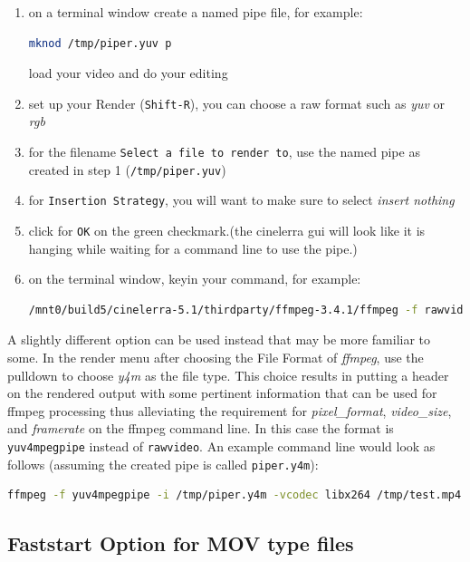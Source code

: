 \begin{enumerate}
    \item on a terminal window create a named pipe file, for example:
    \begin{lstlisting}[language=bash]
mknod /tmp/piper.yuv p
    \end{lstlisting}
    load your video and do your editing
    \item set up your Render (\texttt{Shift-R}), you can choose a raw format such as \textit{yuv} or \textit{rgb}
    \item for the filename \texttt{Select a file to render to}, use the named pipe as created in step 1 (\texttt{/tmp/piper.yuv})
    \item for \texttt{Insertion Strategy}, you will want to make sure to select \textit{insert nothing}
    \item click for \texttt{OK} on the green checkmark.(the cinelerra gui will look like it is hanging while waiting for a command line to use the pipe.)
    \item on the terminal window, keyin your command, for example:
    \begin{lstlisting}[language=bash]
/mnt0/build5/cinelerra-5.1/thirdparty/ffmpeg-3.4.1/ffmpeg -f rawvideo -pixel_format yuv420p \ -video_size 1280x720 -framerate 30000/1001 -i /tmp/piper.yuv /tmp/pys.mov
    \end{lstlisting}
\end{enumerate}

A slightly different option can be used instead that may be more familiar to some.  In the render menu after choosing the File Format of \textit{ffmpeg}, use the pulldown to choose \textit{y4m} as the file type.  This choice results in putting a header on the rendered output with some pertinent information that can be used for ffmpeg processing thus alleviating the requirement for \textit{pixel\_format}, \textit{video\_size}, and \textit{framerate} on the ffmpeg command line.  In this case the format is \texttt{yuv4mpegpipe} instead of \texttt{rawvideo}.  An example command line would look as follows (assuming the created pipe is called \texttt{piper.y4m}):
\begin{lstlisting}[language=bash]
ffmpeg -f yuv4mpegpipe -i /tmp/piper.y4m -vcodec libx264 /tmp/test.mp4
\end{lstlisting}

\subsection{Faststart Option for MOV type files}%
\label{sub:faststart_option_mov0}


